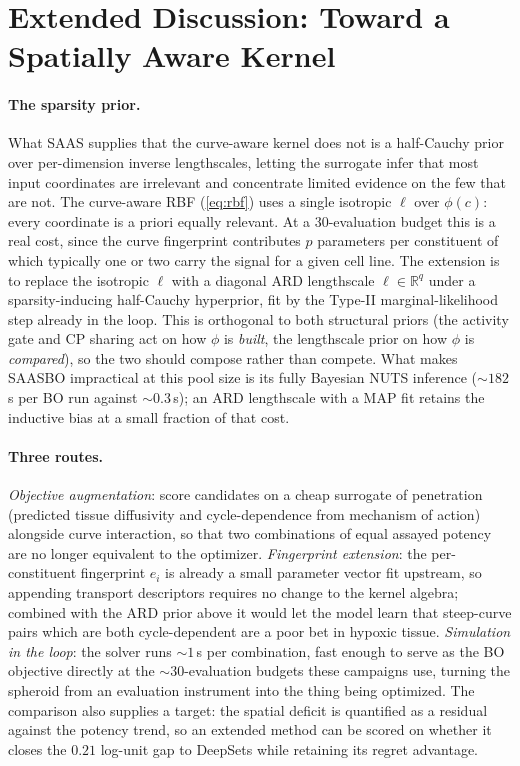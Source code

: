 \documentclass{article}
\begin{document}
\section{Extended Discussion: Toward a Spatially Aware Kernel}
\label{app:future}

\paragraph{The sparsity prior.} What SAAS supplies that the curve-aware
kernel does not is a half-Cauchy prior over per-dimension inverse
lengthscales, letting the surrogate infer that most input coordinates are
irrelevant and concentrate limited evidence on the few that are not. The
curve-aware RBF (\cref{eq:rbf}) uses a single isotropic $\ell$ over
$\phi(c)$: every coordinate is a priori equally relevant. At a
30-evaluation budget this is a real cost, since the curve fingerprint
contributes $p$ parameters per constituent of which typically one or two
carry the signal for a given cell line. The extension is to replace the
isotropic $\ell$ with a diagonal ARD lengthscale
$\ell \in \mathbb{R}^q$ under a sparsity-inducing half-Cauchy hyperprior,
fit by the Type-II marginal-likelihood step already in the loop. This is orthogonal to both structural priors (the activity gate and CP sharing act on how $\phi$ is \emph{built}, the lengthscale prior on how $\phi$ is \emph{compared}), so the two should compose rather than compete. What makes
SAASBO impractical at this pool size is its fully Bayesian NUTS inference
(${\sim}182$\,s per BO run against ${\sim}0.3$\,s); an ARD lengthscale with
a MAP fit retains the inductive bias at a small fraction of that cost.

\paragraph{Three routes.} \emph{Objective augmentation}: score candidates on
a cheap surrogate of penetration (predicted tissue diffusivity and
cycle-dependence from mechanism of action) alongside curve interaction, so
that two combinations of equal assayed potency are no longer equivalent to
the optimizer. \emph{Fingerprint extension}: the per-constituent fingerprint
$e_i$ is already a small parameter vector fit upstream, so appending
transport descriptors requires no change to the kernel algebra; combined
with the ARD prior above it would let the model learn that steep-curve pairs
which are both cycle-dependent are a poor bet in hypoxic tissue.
\emph{Simulation in the loop}: the solver runs ${\sim}1$\,s per combination,
fast enough to serve as the BO objective directly at the ${\sim}30$-evaluation
budgets these campaigns use, turning the spheroid from an evaluation
instrument into the thing being optimized. The comparison also supplies a
target: the spatial deficit is quantified as a residual against the potency
trend, so an extended method can be scored on whether it closes the $0.21$
log-unit gap to DeepSets while retaining its regret advantage.
\end{document}
